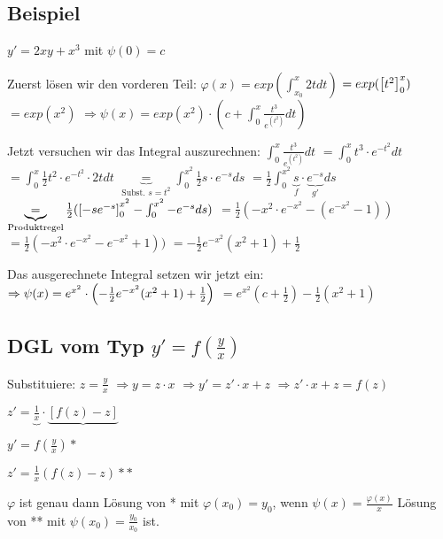 \renewcommand{\ldate}{2015-12-10}

\subsection{Beispiel}
$y' = 2xy + x^3$ mit $\psi(0) = c$

Zuerst lösen wir den vorderen Teil: $ \varphi(x) = exp(\int_{x_0}^{x} 2t dt)$
$=exp( \left[ t^2 \right] _0^x)$
$=exp(x^2)$
$\Rightarrow \psi(x) = exp(x^2) \cdot (c+\int_{0}^{x} \frac{t^3}{e^{(t^2)}} dt)$

Jetzt versuchen wir das Integral auszurechnen: 
$\int_{0}^{x} \frac{t^3}{e^{(t^2)}} dt $
$=\int_{0}^{x} t^3 \cdot e^{-t^2} dt $
$=\int_{0}^{x} \frac{1}{2} t^2 \cdot e^{-t^2} \cdot 2t dt$
$\underbrace{=}_{\textrm{Subst. } s=t^2} \int_{0}^{x^2} \frac{1}{2} s \cdot e^{-s} ds$
$=\frac{1}{2} \int_{0}^{x^2} \underbrace{s}_{f}\cdot \underbrace{e^{-s}}_{g'} ds$
$\underbrace{=}_{\textrm{Produktregel}} \frac{1}{2} ( \left[ -s e^{-s} \right] _0^{x^2} - \int_{0}^{x^2} - e^{-s} ds)$
$=\frac{1}{2} (-x^2 \cdot e^{-x^2} - (e^{-x^2} - 1) )$
$=\frac{1}{2} (-x^2 \cdot e^{-x^2} - e^{-x^2} + 1))$
$=-\frac{1}{2} e^{-x^2} (x^2+1) + \frac{1}{2}$

Das ausgerechnete Integral setzen wir jetzt ein: 
$\Rightarrow \psi(x) = e^{x^2} \cdot  \left( -\frac{1}{2} e^{-x^2} (x^2+1) + \frac{1}{2} \right) $
$=e^{x^2} (c+\frac{1}{2}) - \frac{1}{2} (x^2 + 1)$

\subsection{DGL vom Typ $y' = f(\frac{y}{x})$}
Substituiere: $z=\frac{y}{x}$
$\Rightarrow y=z \cdot x $
$\Rightarrow y' = z' \cdot x + z$
$\Rightarrow z'\cdot x + z = f(z)$

$z'= \underbrace{\frac{1}{x}} \cdot \underbrace{[f(z) - z]} $ 

\begin{satz}
$y' = f(\frac{y}{x}) *$

$z' = \frac{1}{x} (f(z)-z) **$

$\varphi$ ist genau dann Lösung von * mit $\varphi(x_0)=y_0$, wenn $\psi (x) = \frac{\varphi(x)}{x}$ Lösung von ** mit 
$ \psi(x_0) = \frac{y_0}{x_0}$ ist.
\end{satz}

